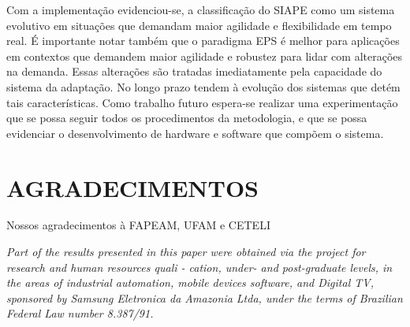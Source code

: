 \documentclass[10pt,letterpaper,twocolumn]{IEEEtran}
\begin{document}
Com a implementação evidenciou-se, a classificação do SIAPE como um sistema evolutivo em situações que demandam maior agilidade e flexibilidade em tempo real. É importante notar também que o paradigma EPS é melhor para aplicações em contextos que demandem maior agilidade e robustez para lidar com alterações na demanda. Essas alterações são tratadas imediatamente pela capacidade do sistema da adaptação. No longo prazo tendem à evolução dos sistemas que detém tais características. 
Como trabalho futuro espera-se realizar uma experimentação que se possa seguir todos os procedimentos da metodologia, e que se possa evidenciar o desenvolvimento de hardware e software que compõem o sistema.

\section{AGRADECIMENTOS}

Nossos agradecimentos à FAPEAM, UFAM e CETELI

\textit{Part of the results presented in this paper were obtained via the project for research and human resources quali
- cation, under- and post-graduate levels, in the areas of industrial automation, mobile devices software, and Digital TV,
sponsored by Samsung Eletronica da Amazonia Ltda, under the terms of Brazilian Federal Law number 8.387/91.}


\end{document}
